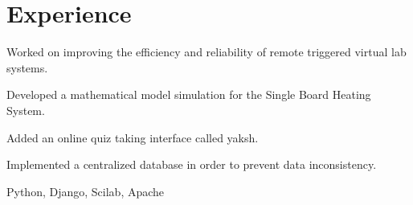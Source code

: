 
\section{Experience}

\vspace{\topsep} %
\begin{tightemize}\item Worked on improving the efficiency and reliability of remote triggered virtual lab systems.
\item Developed a mathematical model simulation for the Single Board Heating System.
\item Added an online quiz taking interface called yaksh.
\item Implemented a centralized database in order to prevent data inconsistency.
\item {} Python, Django, Scilab, Apache
\end{tightemize}
\sectionsep